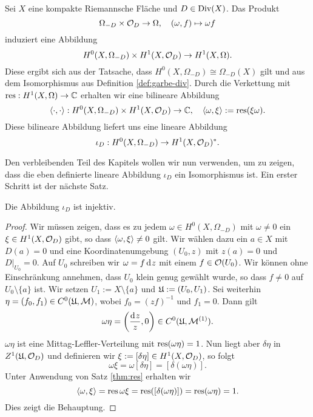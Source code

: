 \begin{defin}
  Sei $X$ eine kompakte Riemannsche Fläche und $D \in \operatorname{Div}(X)$. Das
  Produkt
  \[
  \Omega_{-D} \times \mathcal{O}_D \rightarrow \Omega, \quad (\omega, f) \mapsto
  \omega f
  \]
  induziert eine Abbildung
  \[
  H^0(X, \Omega_{-D}) \times H^1(X, \mathcal{O}_D) \rightarrow H^1(X, \Omega).
  \]
  Diese ergibt sich aus der Tatsache, dass $H^0(X, \Omega_{-D}) \cong
  \Omega_{-D}(X)$ gilt und aus dem Isomorphismus aus Definition
  \ref{def:garbe-div}. Durch die Verkettung mit $\operatorname{res}: H^1(X,
  \Omega) \rightarrow \mathbb{C}$ erhalten wir eine bilineare Abbildung
  \[
  \langle \cdot, \cdot \rangle: H^0(X, \Omega_{-D}) \times H^1(X, \mathcal{O}_D) \rightarrow \mathbb{C},
  \quad \langle \omega, \xi \rangle := \operatorname{res}(\xi \omega).
  \]
  Diese bilineare Abbildung liefert uns eine lineare Abbildung
  \[
  \iota_D : H^0(X, \Omega_{-D}) \rightarrow H^1(X, \mathcal{O}_D)^\ast.
  \]
\end{defin}

Den verbleibenden Teil des Kapitels wollen wir nun verwenden, um zu zeigen, dass die
eben definierte lineare Abbildung $\iota_D$ ein Isomorphismus ist. Ein
erster Schritt ist der nächste Satz.

\begin{thm}
  \label{thm:iota-inj}
  Die Abbildung $\iota_D$ ist injektiv.
\end{thm}

\begin{proof}
  Wir müssen zeigen, dass es zu jedem $\omega \in H^0(X, \Omega_{-D})$
  mit $\omega \neq 0$ ein \break$\xi \in H^1(X, \mathcal{O}_D)$ gibt, so dass
  $\langle \omega, \xi \rangle \neq 0$ gilt. Wir wählen dazu ein $a \in X$ mit
  $D(a) = 0$ und eine Koordinatenumgebung $(U_0, z)$ mit $z(a) = 0$
  und $D|_{U_0} = 0$. Auf $U_0$ schreiben wir $\omega = f \d[z]$
  mit einem $f \in \mathcal{O}(U_0)$. Wir können ohne Einschränkung annehmen,
  dass $U_0$ klein genug gewählt wurde, so dass $f \neq 0$ auf $U_0
  \setminus \{a\}$ ist. Wir setzen $U_1 := X \setminus \{a\}$ und $\mathfrak{U} :=
  (U_0, U_1)$. Sei weiterhin $\eta = (f_0, f_1) \in C^0(\mathfrak{U}, \mathcal{M})$,
  wobei $f_0 = (z f)^{-1}$ und $f_1 = 0$. Dann gilt
  \[
  \omega \eta = \left ( \frac{\d[z]}{z}, 0 \right ) \in C^0(\fu,
  \mer^{(1)}).
  \]
  $\omega \eta$ ist eine Mittag-Leffler-Verteilung mit
  $\operatorname{res}(\omega\eta) = 1$. Nun liegt aber $\delta \eta$ in $Z^1(\mathfrak{U},
  \mathcal{O}_D)$ und definieren wir $\xi := [\delta \eta] \in H^1(X,
  \mathcal{O}_D)$, so folgt
  \[
  \omega \xi = \omega [\delta \eta] = [ \delta( \omega \eta)].
  \]
  Unter Anwendung von Satz \ref{thm:res} erhalten wir
  \[
  \langle \omega, \xi \rangle = \operatorname{res}{\omega \xi} = \operatorname{res}([\delta(\omega \eta)]) =
  \operatorname{res}(\omega \eta) = 1.
  \]
  Dies zeigt die Behauptung.
\end{proof}


